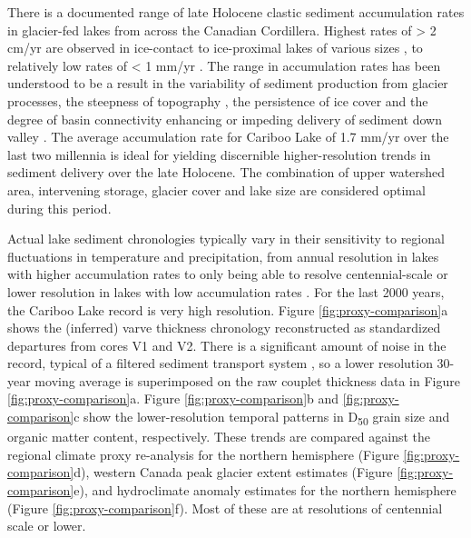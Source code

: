 \documentclass[Royal,times,doublespace,sageh]{sagej}
\begin{document}
There is a documented range of late Holocene clastic sediment
accumulation rates in glacier-fed lakes from across the Canadian
Cordillera. Highest rates of \textgreater{} 2 cm/yr are observed in
ice-contact to ice-proximal lakes of various sizes
\citep{Desloges1994d, Crookshanks2008}, to relatively low rates of
\textless{} 1 mm/yr \citep{Gilbert2012}. The range in accumulation rates
has been understood to be a result in the variability of sediment
production from glacier processes, the steepness of topography
\citep{Ballantyne2002}, the persistence of ice cover and the degree of
basin connectivity enhancing or impeding delivery of sediment down
valley \citep{Wohl2019}. The average accumulation rate for Cariboo Lake
of 1.7 mm/yr over the last two millennia is ideal for yielding
discernible higher-resolution trends in sediment delivery over the late
Holocene. The combination of upper watershed area, intervening storage,
glacier cover and lake size are considered optimal during this period.

Actual lake sediment chronologies typically vary in their sensitivity to
regional fluctuations in temperature and precipitation, from annual
resolution in lakes with higher accumulation rates
\citep[e.g.][]{Menounos2008c} to only being able to resolve
centennial-scale or lower resolution in lakes with low accumulation
rates \citep[e.g.][]{Desloges1999}. For the last 2000 years, the Cariboo
Lake record is very high resolution. Figure \ref{fig:proxy-comparison}a
shows the (inferred) varve thickness chronology reconstructed as
standardized departures from cores V1 and V2. There is a significant
amount of noise in the record, typical of a filtered sediment transport
system \citep[e.g.][]{Jerolmack2010}, so a lower resolution 30-year
moving average is superimposed on the raw couplet thickness data in
Figure \ref{fig:proxy-comparison}a. Figure \ref{fig:proxy-comparison}b
and \ref{fig:proxy-comparison}c show the lower-resolution temporal
patterns in D\textsubscript{50} grain size and organic matter content,
respectively. These trends are compared against the \citet{Moberg2005}
regional climate proxy re-analysis for the northern hemisphere (Figure
\ref{fig:proxy-comparison}d), \citet{Solomina2016} western Canada peak
glacier extent estimates (Figure \ref{fig:proxy-comparison}e), and
\citet{Ljungqvist2016} hydroclimate anomaly estimates for the northern
hemisphere (Figure \ref{fig:proxy-comparison}f). Most of these are at
resolutions of centennial scale or lower.
\end{document}

